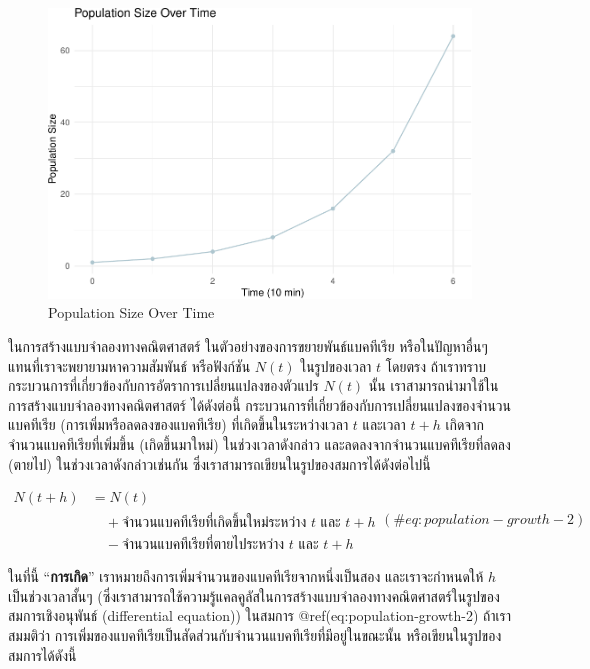 \documentclass[
]{book}
\begin{document}
\begin{figure}
\centering
\includegraphics{SCMA104bookdownproj_files/figure-latex/population-plot-1.pdf}
\caption{Population Size Over Time}
\end{figure}

\label{exm2}
ในการสร้างแบบจำลองทางคณิตศาสตร์ ในตัวอย่างของการขยายพันธ์แบคทีเรีย หรือในปัญหาอื่นๆ
แทนที่เราจะพยายามหาความสัมพันธ์ หรือฟังก์ชัน \(N(t)\) ในรูปของเวลา \(t\) โดยตรง
ถ้าเราทราบกระบวนการที่เกี่ยวข้องกับการอัตราการเปลี่ยนแปลงของตัวแปร \(N(t)\) นั้น
เราสามารถนำมาใช้ในการสร้างแบบจำลองทางคณิตศาสตร์ ได้ดังต่อนี้
กระบวนการที่เกี่ยวข้องกับการเปลี่ยนแปลงของจำนวนแบคทีเรีย (การเพิ่มหรือลดลงของแบคทีเรีย)
ที่เกิดขึ้นในระหว่างเวลา \(t\) และเวลา \(t + h\) เกิดจากจำนวนแบคทีเรียที่เพิ่มขึ้น
(เกิดขึ้นมาใหม่) ในช่วงเวลาดังกล่าว และลดลงจากจำนวนแบคทีเรียที่ลดลง (ตายไป)
ในช่วงเวลาดังกล่าวเช่นกัน ซึ่งเราสามารถเขียนในรูปของสมการได้ดังต่อไปนี้

\begin{equation}
   \begin{aligned}
      N(t + h) &= N(t) \\
               &\quad +     \text{จำนวนแบคทีเรียที่เกิดขึ้นใหม่ระหว่าง } t \text{ และ } t+h \\
              &\quad - \text{จำนวนแบคทีเรียที่ตายไประหว่าง } t \text{ และ } t+h
    \end{aligned}          
    (\#eq:population-growth-2)
\end{equation}

ในที่นี้ ``\textbf{การเกิด}'' เราหมายถึงการเพิ่มจำนวนของแบคทีเรียจากหนึ่งเป็นสอง
และเราจะกำหนดให้ \(h\) เป็นช่วงเวลาสั้นๆ
(ซึ่งเราสามารถใช้ความรู้แคลคูลัสในการสร้างแบบจำลองทางคณิตศาสตร์ในรูปของสมการเชิงอนุพันธ์
(differential equation)) ในสมการ @ref(eq:population-growth-2)
ถ้าเราสมมติว่า การเพิ่มของแบคทีเรียเป็นสัดส่วนกับจำนวนแบคทีเรียที่มีอยู่ในขณะนั้น
หรือเขียนในรูปของสมการได้ดังนี้
\end{document}
